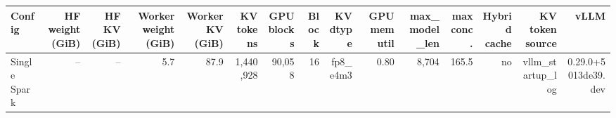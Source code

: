 \begin{tabular}{l r r r r r r r r r r r r r r }
\toprule
Config & HF weight (GiB) & HF KV (GiB) & Worker weight (GiB) & Worker KV (GiB) & KV tokens & GPU blocks & Block & KV dtype & GPU mem util & max\_model\_len & max conc. & Hybrid cache & KV token source & vLLM \\
\midrule
Single Spark & -- & -- & 5.7 & 87.9 & 1,440,928 & 90,058 & 16 & fp8\_e4m3 & 0.80 & 8,704 & 165.5 & no & vllm\_startup\_log & 0.29.0+5013de39.dev \\
\bottomrule
\end{tabular}
